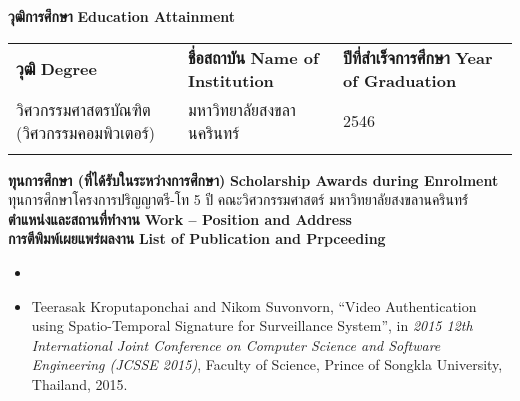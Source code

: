 \documentclass[thesis.tex]{subfiles}
\begin{document}
\begin{vitae}
	\ifsetTH
		\textbf{วุฒิการศึกษา}
	\else
		\textbf{Education Attainment}
	\fi	
	\vspace{1em} \newline
	\begin{tabular*}{\textwidth}{@{}P{.3\textwidth} P{.4\textwidth}@{} P{.3\textwidth}@{}}
		\ifsetTH
			\textbf{วุฒิ}
		\else
			\textbf{Degree}
		\fi	
		& 
		\ifsetTH
			\textbf{ชื่อสถาบัน}
		\else
			\textbf{Name of Institution}
		\fi	
		& 
		\ifsetTH
			\textbf{ปีที่สำเร็จการศึกษา}
		\else
			\textbf{Year of Graduation}
		\fi	 \\
    วิศวกรรมศาสตรบัณฑิต (วิศวกรรมคอมพิวเตอร์) & มหาวิทยาลัยสงขลานครินทร์ &  2546 \\
    \\
	\end{tabular*}
	
	\setlength\parindent{0cm}
	\ifsetTH
		\textbf{ทุนการศึกษา (ที่ได้รับในระหว่างการศึกษา)} 
	\else
		\textbf{Scholarship Awards during Enrolment}
	\fi		
	\vspace{.7em} \newline
  	\setlength\parindent{1cm}
  	\indent ทุนการศึกษาโครงการปริญญาตรี-โท 5 ปี คณะวิศวกรรมศาสตร์ มหาวิทยาลัยสงขลานครินทร์่
	\\
	
	\setlength\parindent{0cm}
	\ifsetTH
		\textbf{ตําแหน่งและสถานที่ทํางาน} 
	\else
		\textbf{Work -- Position and Address}
	\fi	
	\vspace{.7em} \newline
	\setlength\parindent{1cm}
  	\\
	
	\setlength\parindent{0cm}
	\ifsetTH
		\textbf{การตีพิมพ์เผยแพร่ผลงาน}
	\else
		\textbf{List of Publication and Prpceeding}
	\fi	
  \begin{itemize}
    \item {}
    \item Teerasak Kroputaponchai and Nikom  Suvonvorn,
      ``Video Authentication using Spatio-Temporal Signature for
      Surveillance System'', in \textit{2015 12th International Joint Conference
      on Computer Science and Software Engineering (JCSSE 2015)},
      Faculty of Science, Prince of Songkla University,
      Thailand, 2015.
  \end{itemize}


\end{vitae}
\end{document}
